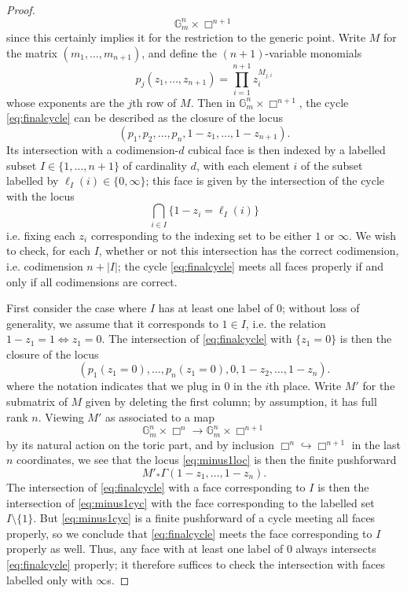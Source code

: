 \documentclass[10pt]{amsart}
\theoremstyle{definition}
\numberwithin{equation}{section}
\begin{document}
\begin{proof}
        \[
        \mathbb{G}_m^n \times \Box^{n+1}
        \]
        since this certainly implies it for the restriction to the generic point. Write $M$ for the matrix $(m_1,\ldots, m_{n+1})$, and define the $(n+1)$-variable monomials
        \[
        p_j(z_1,\ldots, z_{n+1}) = \prod_{i=1}^{n+1} z_i^{M_{j,i}}
        \]
        whose exponents are the $j$th row of $M$. Then in $\mathbb{G}_m^n \times \Box^{n+1}$, the cycle \eqref{eq:finalcycle} can be described as the closure of the locus
        \[
        (p_1, p_2, \ldots, p_n, 1-z_1,\ldots, 1-z_{n+1}). 
        \]
        Its intersection with a codimension-$d$ cubical face is then indexed by a labelled subset $I\in \{1,\ldots, n+1\}$ of cardinality $d$, with each element $i$ of the subset labelled by $\ell_I(i)\in \{0,\infty\}$; this face is given by the intersection of the cycle with the locus
        \[
        \bigcap_{i\in I} \{ 1-z_i = \ell_I(i)\} 
        \]
        i.e. fixing each $z_i$ corresponding to the indexing set to be either $1$ or $\infty$. We wish to check, for each $I$, whether or not this intersection has the correct codimension, i.e. codimension $n+|I|$; the cycle \eqref{eq:finalcycle} meets all faces properly if and only if all codimensions are correct. 

        First consider the case where $I$ has at least one label of $0$; without loss of generality, we assume that it corresponds to $1\in I$, i.e. the relation $1-z_1=1\Leftrightarrow z_1=0$. The intersection of \eqref{eq:finalcycle} with $\{z_1=0\}$ is then the closure of the locus
        \begin{equation} \label{eq:minus1loc}
        (p_1(z_1=0),\ldots, p_n(z_1=0), 0, 1-z_2,\ldots, 1-z_n).
        \end{equation}
        where the notation indicates that we plug in $0$ in the $i$th place. Write $M'$ for the submatrix of $M$ given by deleting the first column; by assumption, it has full rank $n$. Viewing $M'$ as associated to a map
        \[
        \mathbb{G}_m^n \times \Box^n \to \mathbb{G}_m^n \times \Box^{n+1}
        \]
        by its natural action on the toric part, and by inclusion $\Box^n\hookrightarrow \Box^{n+1}$ in the last $n$ coordinates, we see that the locus \eqref{eq:minus1loc} is then the finite pushforward
        \begin{equation}\label{eq:minus1cyc}
        M'_* \Gamma(1-z_1,\ldots, 1-z_n).
        \end{equation}
        The intersection of \eqref{eq:finalcycle} with a face corresponding to $I$ is then the intersection of \eqref{eq:minus1cyc} with the face corresponding to the labelled set $I\setminus \{1\}$. But \eqref{eq:minus1cyc} is a finite pushforward of a cycle meeting all faces properly, so we conclude that \eqref{eq:finalcycle} meets the face corresponding to $I$ properly as well. Thus, any face with at least one label of $0$ always intersects \eqref{eq:finalcycle} properly; it therefore suffices to check the intersection with faces labelled only with $\infty$s. 


\end{proof}
\end{document}
